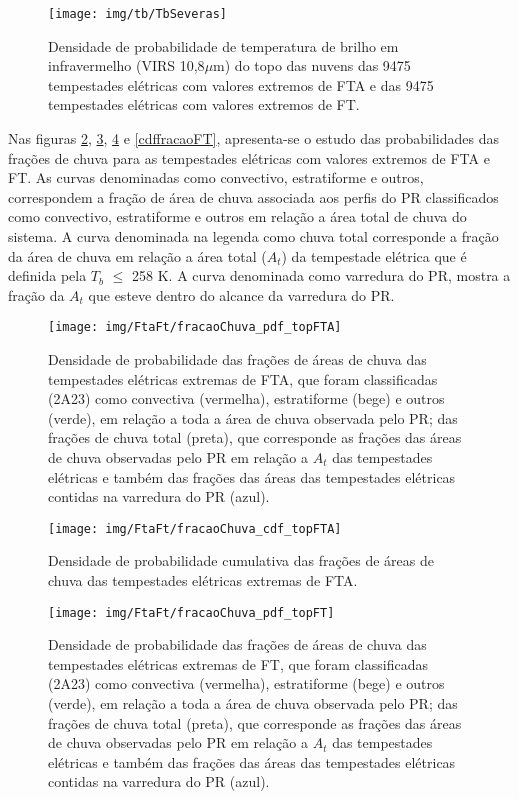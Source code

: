 \begin{figure}[!ht]
  \centering 
  \texttt{[image: img/tb/TbSeveras]}
  \caption{Densidade de probabilidade de temperatura de brilho em infravermelho (VIRS 10,8$\mu$m) do topo das nuvens das 9475 tempestades elétricas com valores extremos de FTA  e das 9475 tempestades elétricas com valores extremos de FT.}
  \label{tb}
\end{figure}


Nas figuras \ref{pdffracaoFTA}, \ref{cdffracaoFTA}, \ref{pdffracaoFT} e  \ref{cdffracaoFT}, apresenta-se o estudo das probabilidades das frações de chuva para as tempestades elétricas com valores extremos de FTA e FT. As curvas denominadas como convectivo, estratiforme e outros, correspondem a fração de área de chuva associada aos perfis do PR classificados como convectivo, estratiforme e outros em relação a área total de chuva do sistema. A curva denominada na legenda como chuva total corresponde a fração da área de chuva em relação a área total ($A_t$) da tempestade elétrica que é definida pela $T_b$ $\leq$ 258 K. A curva denominada como varredura do PR, mostra a fração da $A_t$ que esteve dentro do alcance da varredura do PR.

\begin{figure}[!ht]
  \centering
  \texttt{[image: img/FtaFt/fracaoChuva\_pdf\_topFTA]}   
  \caption{Densidade de probabilidade das frações de áreas de chuva das tempestades elétricas extremas de FTA, que foram classificadas (2A23) como convectiva (vermelha), estratiforme (bege) e outros (verde), em relação a toda a área de chuva observada pelo PR; das frações de chuva total (preta), que corresponde as frações das áreas de chuva observadas pelo PR em relação a $A_t$ das tempestades elétricas e também das frações das áreas das tempestades elétricas contidas na varredura do PR (azul).}
  \label{pdffracaoFTA}  
\end{figure}

\begin{figure}[!ht]
  \centering 
  \texttt{[image: img/FtaFt/fracaoChuva\_cdf\_topFTA]}
  \caption{Densidade de probabilidade cumulativa das frações de áreas de chuva das tempestades elétricas extremas de FTA.}
  \label{cdffracaoFTA}
\end{figure}

\begin{figure}[!ht]
  \centering
  \texttt{[image: img/FtaFt/fracaoChuva\_pdf\_topFT]}   
  \caption{Densidade de probabilidade das frações de áreas de chuva das tempestades elétricas extremas de FT, que foram classificadas (2A23) como convectiva (vermelha), estratiforme (bege) e outros (verde), em relação a toda a área de chuva observada pelo PR; das frações de chuva total (preta), que corresponde as frações das áreas de chuva observadas pelo PR em relação a $A_t$ das tempestades elétricas e também das frações das áreas das tempestades elétricas contidas na varredura do PR (azul).}
  \label{pdffracaoFT}  
\end{figure}

